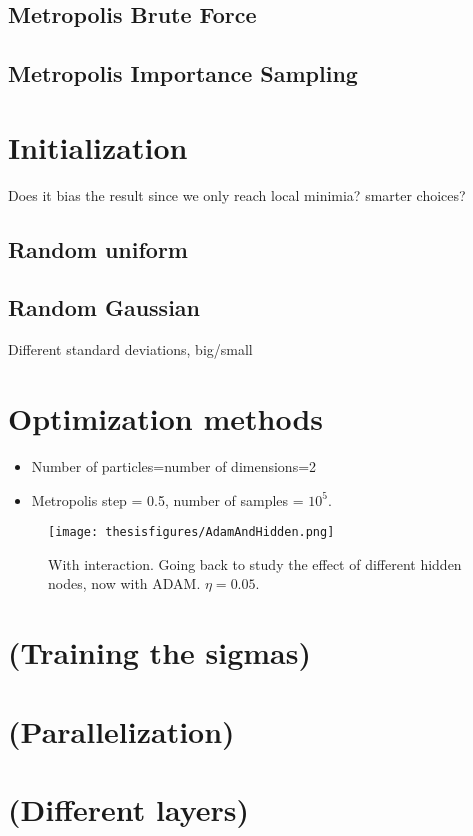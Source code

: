 \documentclass[twoside,english]{uiofysmaster}
\begin{document}
\subsection{Metropolis Brute Force}
\subsection{Metropolis Importance Sampling}

\section{Initialization}
Does it bias the result since we only reach local minimia? smarter choices?

\subsection{Random uniform}
\subsection{Random Gaussian}
Different standard deviations, big/small

\section{Optimization methods}



\begin{itemize}
	\item Number of particles=number of dimensions=2
	\item Metropolis step = 0.5, number of samples = $10^5$. 
\end{itemize}

\begin{figure}
\centering
 \texttt{[image: thesisfigures/AdamAndHidden.png]}
 \caption{With interaction. Going back to study the effect of different hidden nodes, now with ADAM. $\eta=0.05$.}
 \label{fig:AdamAndHidden}
\end{figure}

\section{(Training the sigmas)}
\section{(Parallelization)}
\section{(Different layers)}
\end{document}

